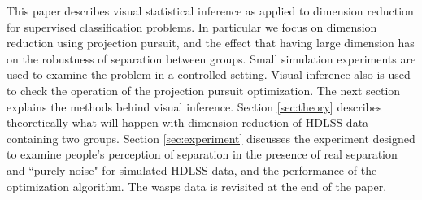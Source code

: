 This paper describes visual statistical inference as applied to dimension reduction for supervised classification problems. In particular we focus on dimension reduction using projection pursuit, and the effect that having large dimension has on the robustness of separation between groups.  Small simulation experiments are used to examine the problem in a controlled setting. Visual inference also is used to check the operation of the projection pursuit optimization. The next section explains the methods behind visual inference. Section \ref{sec:theory} describes theoretically what will happen with dimension reduction of HDLSS data containing two groups. Section \ref{sec:experiment} discusses the experiment designed to examine people's perception of separation in the presence of real separation and ``purely noise" for simulated HDLSS data, and the performance of the optimization algorithm. The wasps data is revisited at the end of the paper. 


